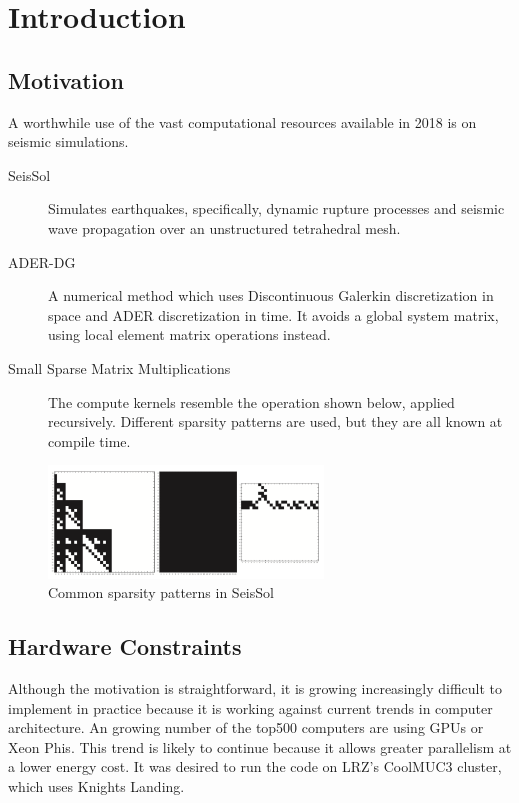 \chapter{Introduction}
\label{chapter:Introduction}


\section{Motivation}

A worthwhile use of the vast computational resources available in 2018 is on seismic simulations. 

\begin{description}
	\item[SeisSol]
    Simulates earthquakes, specifically, dynamic rupture processes and seismic wave propagation over an unstructured tetrahedral mesh. 

    \item[ADER-DG]
    A numerical method which uses Discontinuous Galerkin discretization in space and ADER discretization in time. It avoids a global system matrix, using local element matrix operations instead.

    \item[Small Sparse Matrix Multiplications]
    The compute kernels resemble the operation shown below, applied recursively. Different sparsity patterns are used, but they are all known at compile time.
\end{description}

\begin{figure}
  \centering
  \includegraphics[height=3cm]{images/seissol_visc.png}
  \caption{Common sparsity patterns in SeisSol}
  \label{fig:seissol_star}
\end{figure}

\section{Hardware Constraints}
\label{section:knl}

Although the motivation is straightforward, it is growing increasingly difficult to implement in practice because it is working against current trends in computer architecture. An growing number of the top500 computers are using GPUs or Xeon Phis. This trend is likely to continue because it allows greater parallelism at a lower energy cost. It was desired to run the code on LRZ's CoolMUC3 cluster, which uses Knights Landing.

